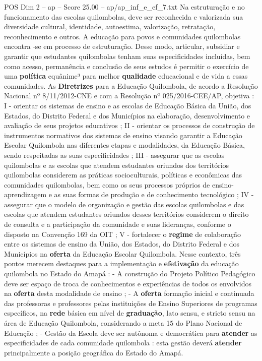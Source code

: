 \begin{textsample}{POS Dim 2 – ap – Score 25.00 – ap/ap\_inf\_e\_ef\_7.txt}
Na estruturação e no funcionamento das escolas quilombolas, deve ser reconhecida e valorizada sua diversidade cultural, identidade, autoestima, valorização, retratação, reconhecimento e outros.
A educação para povos e comunidades quilombolas encontra -se em processo de estruturação.
Desse modo, articular, subsidiar e garantir que estudantes quilombolas tenham suas especificidades incluídas, bem como acesso, permanência e conclusão de seus estudos é permitir o exercício de uma \textbf{política} equânime³ para melhor \textbf{qualidade} educacional e de vida a essas comunidades.
As \textbf{Diretrizes} para a Educação Quilombola, de acordo a Resolução Nacional nº 8/11/2012-CNE e com a Resolução nº 025/2016-CEE/AP, objetiva : I - orientar os sistemas de ensino e as escolas de Educação Básica da União, dos Estados, do Distrito Federal e dos Municípios na elaboração, desenvolvimento e avaliação de seus projetos educativos ; II - orientar os processos de construção de instrumentos normativos dos sistemas de ensino visando garantir a Educação Escolar Quilombola nas diferentes etapas e modalidades, da Educação Básica, sendo respeitadas as suas especificidades ; III - assegurar que as escolas quilombolas e as escolas que atendem estudantes oriundos dos territórios quilombolas considerem as práticas socioculturais, políticas e econômicas das comunidades quilombolas, bem como os seus processos próprios de ensino-aprendizagem e as suas formas de produção e de conhecimento tecnológico ; IV - assegurar que o modelo de organização e gestão das escolas quilombolas e das escolas que atendem estudantes oriundos desses territórios considerem o direito de consulta e a participação da comunidade e suas lideranças, conforme o disposto na Convenção 169 da OIT ; V - fortalecer o \textbf{regime} de colaboração entre os sistemas de ensino da União, dos Estados, do Distrito Federal e dos Municípios na \textbf{oferta} da Educação Escolar Quilombola.
Nesse contexto, três pontos merecem destaques para a implementação e \textbf{efetivação} da educação quilombola no Estado do Amapá : - A construção do Projeto Político Pedagógico deve ser espaço de troca de conhecimentos e experiências de todos os envolvidos na \textbf{oferta} desta modalidade de ensino ; - A \textbf{oferta} formação inicial e continuada das professoras e professores pelas instituições de Ensino Superiores de programas específicos, na \textbf{rede} básica em nível de \textbf{graduação}, lato sensu, e stricto sensu na área de Educação Quilombola, considerando a meta 15 do Plano Nacional de Educação ; - Gestão da Escola deve ser autônoma e democrática para \textbf{atender} as especificidades de cada comunidade quilombola : esta gestão deverá \textbf{atender} principalmente a posição geográfica do Estado do Amapá.

\end{textsample}
